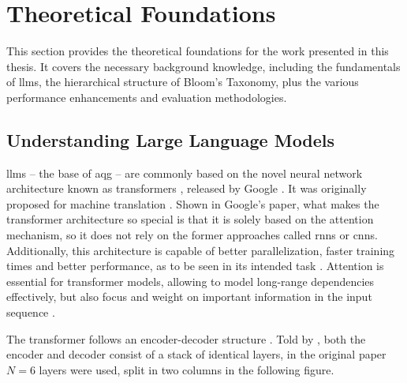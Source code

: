 \section{Theoretical Foundations} \label{sec:theoretical-foundations}

This section provides the theoretical foundations for the work presented in this thesis. It covers the necessary background knowledge, including the fundamentals of \ac{llms}, the hierarchical structure of Bloom's Taxonomy, plus the various performance enhancements and evaluation methodologies.

\subsection{Understanding Large Language Models}

 \ac{llms} -- the base of \ac{aqg} -- are commonly based on the novel neural network architecture known as transformers \cite{naik_large_2024}, released by Google \cite{vaswani_attention_2017}. It was originally proposed for machine translation \cite{minaee_large_2025,vaswani_attention_2017}. Shown in Google's paper, what makes the transformer architecture so special is that it is solely based on the attention mechanism, so it does not rely on the former approaches called \ac{rnns} or \ac{cnns}. Additionally, this architecture is capable of better parallelization, faster training times and better performance, as to be seen in its intended task \cite{vaswani_attention_2017}. Attention is essential for transformer models, allowing to model long-range dependencies effectively, but also focus and weight on important information in the input sequence \cite{patil_review_2024}. 

The transformer follows an encoder-decoder structure \cite{patil_review_2024,minaee_large_2025}. Told by \cite{minaee_large_2025,vaswani_attention_2017}, both the encoder and decoder consist of a stack of identical layers, in the original paper $N=6$ layers were used, split in two columns in the following figure.

